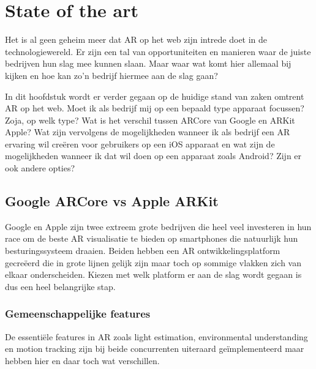 \chapter{State of the art}
\label{ch:stand-van-zaken}



Het is al geen geheim meer dat AR op het web zijn intrede doet in de technologiewereld. Er zijn een tal van opportuniteiten en manieren waar de juiste bedrijven hun slag mee kunnen slaan. Maar waar wat komt hier allemaal bij kijken en hoe kan zo'n bedrijf hiermee aan de slag gaan? 

In dit hoofdstuk wordt er verder gegaan op de huidige stand van zaken omtrent AR op het web. Moet ik als bedrijf mij op een bepaald type apparaat focussen? Zoja, op welk type? Wat is het verschil tussen ARCore van Google en ARKit Apple? Wat zijn vervolgens de mogelijkheden wanneer ik als bedrijf een AR ervaring wil creëren voor gebruikers op een iOS apparaat en wat zijn de mogelijkheden wanneer ik dat wil doen op een apparaat zoals Android? Zijn er ook andere opties?

\section{Google ARCore vs Apple ARKit}
\label{sec:google-arcore-vs-apple-arkit}

Google en Apple zijn twee extreem grote bedrijven die heel veel investeren in hun race om de beste AR visualisatie te bieden op smartphones die natuurlijk hun besturingssysteem draaien. Beiden hebben een AR ontwikkelingsplatform gecreëerd die in grote lijnen gelijk zijn maar toch op sommige vlakken zich van elkaar onderscheiden. Kiezen met welk platform er aan de slag wordt gegaan is dus een heel belangrijke stap. 

\subsection{Gemeenschappelijke features}

De essentiële features in AR zoals light estimation, environmental understanding en motion tracking zijn bij beide concurrenten uiteraard geïmplementeerd maar hebben  hier en daar toch wat verschillen. 

